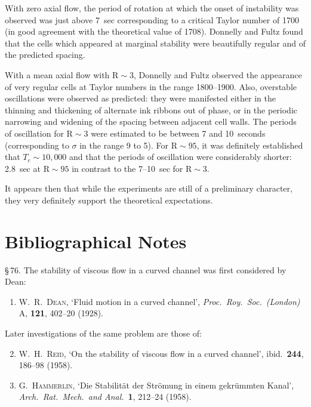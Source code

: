 With zero axial flow, the period of rotation at which the onset of instability was observed was just above 7~sec corresponding to a critical Taylor number of 1700 (in good agreement with the theoretical value of 1708). Donnelly and Fultz found that the cells which appeared at marginal stability were beautifully regular and of the predicted spacing.

With a mean axial flow with $\mathrm{R}\sim 3$, Donnelly and Fultz observed the appearance of very regular cells at Taylor numbers in the range 1800--1900. Also, overstable oscillations were observed as predicted: they were manifested either in the thinning and thickening of alternate ink ribbons out of phase, or in the periodic narrowing and widening of the spacing between adjacent cell walls. The periods of oscillation for $\mathrm{R}\sim 3$ were estimated to be between 7 and 10~seconds (corresponding to $\sigma$ in the range 9 to 5). For $\mathrm{R}\sim 95$, it was definitely established that $T_c\sim 10{,}000$ and that the periods of oscillation were considerably shorter: 2.8~sec at $\mathrm{R}\sim 95$ in contrast to the 7--10~sec for $\mathrm{R}\sim 3$.

It appears then that while the experiments are still of a preliminary character, they very definitely support the theoretical expectations.

\section*{Bibliographical Notes}
\label{sec:8-bib}

\noindent\S\,76. The stability of viscous flow in a curved channel was first considered by Dean:

\begin{enumerate}
\item W.~R.~\textsc{Dean}, `Fluid motion in a curved channel', \emph{Proc.\ Roy.\ Soc.\ (London)} A, \textbf{121}, 402--20 (1928).
\end{enumerate}

\noindent Later investigations of the same problem are those of:

\begin{enumerate}\setcounter{enumi}{1}
\item W.~H.~\textsc{Reid}, `On the stability of viscous flow in a curved channel', ibid.\ \textbf{244}, 186--98 (1958).
\item G.~\textsc{Hammerlin}, `Die Stabilit\"at der Str\"omung in einem gekr\"ummten Kanal', \emph{Arch.\ Rat.\ Mech.\ and Anal.}\ \textbf{1}, 212--24 (1958).
\end{enumerate}

